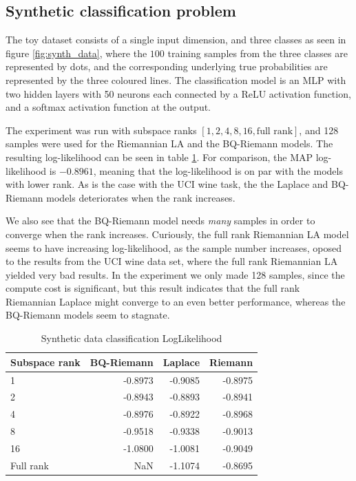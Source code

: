\subsection{Synthetic classification problem}
The toy dataset consists of a single input dimension, and three classes as seen in figure \ref{fig:synth_data}, where the $100$ training samples from the three classes are represented by dots, and the corresponding underlying true probabilities are represented by the three coloured lines. The classification model is an MLP with two hidden layers with 50 neurons each connected by a ReLU activation function, and a softmax activation function at the output.

The experiment was run with subspace ranks $[1, 2, 4, 8, 16, \text{full rank}]$, and 128 samples were used for the Riemannian LA and the BQ-Riemann models. The resulting log-likelihood can be seen in table \ref{tab:synth_table1}. For comparison, the MAP log-likelihood is $-0.8961$, meaning that the log-likelihood is on par with the models with lower rank. As is the case with the UCI wine task, the the Laplace and BQ-Riemann models deteriorates when the rank increases.

We also see that the BQ-Riemann model needs \emph{many} samples in order to converge when the rank increases. Curiously, the full rank Riemannian LA model seems to have increasing log-likelihood, as the sample number increases, oposed to the results from the UCI wine data set, where the full rank Riemannian LA yielded very bad results. In the experiment we only made 128 samples, since the compute cost is significant, but this result indicates that the full rank Riemannian Laplace might converge to an even better performance, whereas the BQ-Riemann models seem to stagnate.

\begin{table}[H]
\caption{Synthetic data classification LogLikelihood}
\label{tab:synth_table1}
\centering
\begin{tabular}{lrrr}
\toprule
Subspace rank & BQ-Riemann & Laplace & Riemann \\
\midrule
1 & -0.8973 & -0.9085 & -0.8975 \\
2 & -0.8943 & -0.8893 & -0.8941 \\
4 & -0.8976 & -0.8922 & -0.8968 \\
8 & -0.9518 & -0.9338 & -0.9013 \\
16 & -1.0800 & -1.0081 & -0.9049 \\
Full rank & NaN & -1.1074 & -0.8695 \\
\bottomrule
\end{tabular}
\end{table}

